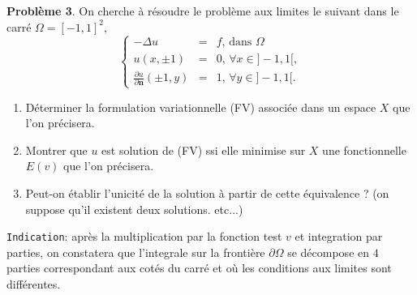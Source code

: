 \documentclass[12pt,a4paper]{article}
\begin{document}
{\bf Probl\`eme 3}. On cherche \`a r\'esoudre le probl\`eme aux
limites le suivant dans le carr\'e $\Omega=[-1,1]^2$, 
\begin{equation}\label{eq:tube}
\left\{\begin{array}{lcl}
-\Delta u &=& f,\,\text{dans }\Omega\\
u(x,\pm 1)&=&0,\,\forall x\in ]-1,1[,\\
\frac{\partial u}{\partial \mathbf{n}}(\pm 1,y)&=&1,\,\forall y\in  ]-1,1[.
\end{array}\right.
\end{equation}
\begin{enumerate}
\item D\'eterminer la formulation variationnelle (FV) associ\'ee dans un
  espace $X$ que l'on pr\'ecisera.
\item Montrer que $u$ est solution de (FV) ssi elle minimise sur $X$ une fonctionnelle $E(v)$ que l'on pr\'ecisera.
\item Peut-on \'etablir l'unicit\'e de la solution \`a partir de cette
  \'equivalence ? (on suppose qu'il existent deux solutions. etc...)
\end{enumerate}
 \texttt{Indication}: apr\`es la
  multiplication par la fonction test $v$ et integration par parties,
  on constatera que l'integrale sur la fronti\`ere $\partial\Omega$
  se d\'ecompose en $4$ parties correspondant aux cot\'es du carr\'e
  et o\`u les conditions aux limites sont diff\'erentes.\\
\end{document}
